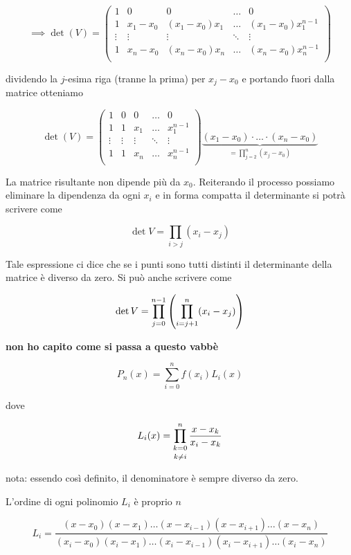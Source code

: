 $$\implies \det (V)=
\begin{pmatrix}
   1 & 0 & 0 & \ldots & 0\\
   1 & x_1 - x_0 & (x_1 - x_0)x_1 & \ldots & (x_1 - x_0)x_1^{n-1}\\
   \vdots & \vdots & \vdots & \ddots & \vdots\\
   1 & x_n - x_0 & (x_n - x_0)x_n & \ldots & (x_n - x_0)x_n^{n-1}\\
\end{pmatrix}$$

dividendo la $j$-esima riga (tranne la prima) per $x_j - x_0$ e portando fuori dalla matrice otteniamo

$$\det (V)=
\begin{pmatrix}
   1 & 0 & 0 & \ldots & 0\\
   1 & 1 & x_1 & \ldots & x_1^{n-1}\\
   \vdots & \vdots & \vdots & \ddots & \vdots\\
   1 & 1 & x_n & \ldots & x_n^{n-1}\\
\end{pmatrix}
\underbrace{(x_1 - x_0) \cdot \ldots \cdot (x_n - x_0)}_{\displaystyle = \prod_{j=2}^{n} (x_j - x_0)}$$

La matrice risultante non dipende più da $x_0$. Reiterando il processo possiamo eliminare la dipendenza da ogni $x_i$ e in forma compatta il determinante si potrà scrivere come

$$\det V=\prod_{i>j} (x_i - x_j)$$

Tale espressione ci dice che se i punti sono tutti distinti il determinante della matrice è diverso da zero. Si può anche scrivere come

$$\det V=\prod_{j=0}^{n-1} \qty( \prod_{i=j+1}^{n} (x_i - x_j) )$$

\textbf{non ho capito come si passa a questo vabbè}

$$P_n(x)=\sum_{i=0}^{n} f(x_i) L_i(x)$$

dove

$$L_i(x)=\prod_{\begin{subarray}{c}
   k=0\\[0.1cm]
   k \neq i
\end{subarray}
}^{n} \frac{x - x_k}{x_i - x_k}
$$

nota: essendo così definito, il denominatore è sempre diverso da zero.

L'ordine di ogni polinomio $L_i$ è proprio $n$

$$L_i=\frac{
(x - x_0) (x - x_1) \ldots (x - x_{i-1}) (x - x_{i+1}) \ldots (x - x_n)
}{
(x_i - x_0) (x_i - x_1) \ldots (x_i - x_{i-1}) (x_i - x_{i+1}) \ldots (x_i - x_n)
}$$

